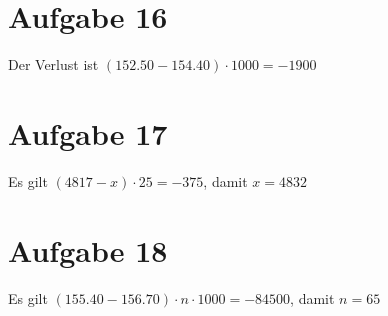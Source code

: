 \documentclass{article}
\begin{document}
	\section*{Aufgabe 16}
	Der Verlust ist $(152.50 - 154.40)\cdot 1000 = -1900$
	
	\section*{Aufgabe 17}
	Es gilt $(4817 - x)\cdot 25 = -375$, damit $x = 4832$
	
	\section*{Aufgabe 18}
	Es gilt $(155.40 - 156.70)\cdot n\cdot 1000 = -84500$, damit $n=65$
	
\end{document}
